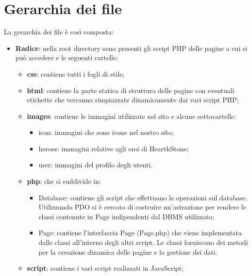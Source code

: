 \section{Gerarchia dei file}
La gerarchia dei file è così composta:
\begin{itemize}
	\item \textbf{Radice}: nella root directory sono presenti gli script PHP delle pagine a cui si può accedere e le seguenti cartelle:
	\begin{itemize}
		\item \textbf{css}: contiene tutti i fogli di stile;
		\item \textbf{html}: contiene la parte statica di struttura delle pagine con eventuali etichette che verranno rimpiazzate dinamicamente dai vari script PHP;
		\item \textbf{images}: contiene le immagini utilizzate nel sito e alcune sottocartelle:
		\begin{itemize}
			\item{icon}: immagini che sono icone nel nostro sito;
			\item{heroes}: immagini relative agli eroi di HearthStone;
			\item{user}: immagini del profilo degli utenti.
		\end{itemize}
		\item \textbf{php}: che si suddivide in:
		\begin{itemize}
			\item {Database}: contiene gli script che effettuano le operazioni sul database. Utilizzando PDO si è cercato di costruire un'astrazione per rendere le classi contenute in Page indipendenti dal DBMS utilizzato;
			\item {Page}: contiene l'interfaccia Page (Page.php) che viene implementata dalle classi all'interno degli altri script. Le classi forniscono dei metodi per la creazione dinamica delle pagine e la gestione dei dati.
		\end{itemize}
		\item \textbf{script}: contiene i vari script realizzati in JavaScript;
	\end{itemize}
\end{itemize}


\newpage